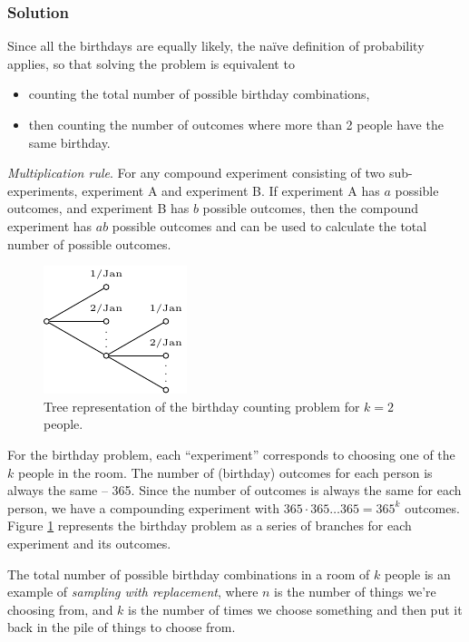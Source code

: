 \clearpage
\subsubsection{Solution}

Since all the birthdays are equally likely, 
the naïve definition of probability applies, 
so that solving the problem is equivalent to
\begin{itemize}
\item
counting the total number of possible birthday combinations,
\item
then counting the number of outcomes where more than 2 people have the same birthday.
\end{itemize}

\emph{Multiplication rule}. 
For any compound experiment consisting of two sub-experiments, 
experiment A and experiment B. 
If experiment A has \(a\) possible outcomes, 
and experiment B has \(b\) possible outcomes,
then the compound experiment has \(ab\) possible outcomes and 
can be used to calculate the total number of possible outcomes.

\begin{figure}[h!]
\centering
\includegraphics[width=0.25\linewidth]{tikz/figure1.pdf}
\caption{Tree representation of the birthday counting problem for \(k=2\) people.}
\label{fig:tree}
\end{figure}

For the birthday problem, 
each ``experiment'' corresponds to choosing one of the \(k\) people in the room. 
The number of (birthday) outcomes for each person is always the same -- 365. 
Since the number of outcomes is always the same for each person, 
we have a compounding experiment with \(365 \cdot 365 \ldots 365 = 365^k\) outcomes.
Figure \ref{fig:tree} represents the birthday problem as a series of 
branches for each experiment and its outcomes.

The total number of possible birthday combinations in a room of \(k\) people is an example 
of \emph{sampling with replacement}, 
where \(n\) is the number of things we're choosing from, 
and \(k\) is the number of times we choose something and then put it 
back in the pile of things to choose from.

